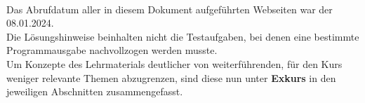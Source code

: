 \Hinweise

\paragraph*{}

Das Abrufdatum aller in diesem Dokument aufgeführten Webseiten war der 08.01.2024.\\

Die Lösungshinweise beinhalten nicht die Testaufgaben, bei denen eine bestimmte Programmausgabe nachvollzogen werden musste.\\

Um Konzepte des Lehrmaterials deutlicher von weiterführenden, für den Kurs weniger relevante Themen abzugrenzen, sind diese nun unter \textbf{Exkurs} in den jeweiligen Abschnitten zusammengefasst.